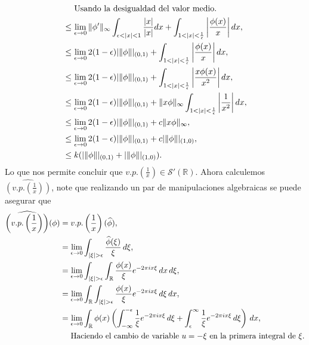 \begin{homeworkProblem}
\begin{solution}
\begin{align*}
      &\phantom{\leq}\hspace{0.2cm}\text{Usando la desigualdad del valor medio.}\\
      &\leq\lim_{\epsilon\rightarrow 0} \|\phi'\|_{\infty}\int_{\epsilon<|x|<1}\frac{|x|}{|x|}dx+\int_{1<|x|<\frac{1}{\epsilon}}\left|\frac{\phi(x)}{x}\right|dx,\\
      &\leq\lim_{\epsilon\rightarrow 0} 2(1-\epsilon)|\|\phi\||_{(0,1)}+\int_{1<|x|<\frac{1}{\epsilon}}\left|\frac{\phi(x)}{x}\right|dx,\\
      &\leq\lim_{\epsilon\rightarrow 0} 2(1-\epsilon)|\|\phi\||_{(0,1)}+\int_{1<|x|<\frac{1}{\epsilon}}\left|\frac{x\phi(x)}{x^2}\right|dx,\\
      &\leq\lim_{\epsilon\rightarrow 0} 2(1-\epsilon)|\|\phi\||_{(0,1)}+\|x\phi\|_{\infty}\int_{1<|x|<\frac{1}{\epsilon}}\left|\frac{1}{x^2}\right|dx,\\
      &\leq \lim_{\epsilon\rightarrow 0}2(1-\epsilon)|\|\phi\||_{(0,1)}+c\|x\phi\|_{\infty},\\
      &\leq \lim_{\epsilon\rightarrow 0}2(1-\epsilon)|\|\phi\||_{(0,1)}+c|\|\phi\||_{(1,0)},\\
      &\leq k(|\|\phi\||_{(0,1)}+|\|\phi\||_{(1,0)}).
    \end{align*}
    Lo que nos permite concluir que $v.p.\left( \frac{1}{x} \right)\in\mathcal{S}'(\mathbb{R})$.
    \newpage
    Ahora calculemos $\hat{\left(v.p.\left( \frac{1}{x} \right)\right)}$, note que realizando un par de manipulaciones algebraicas se puede asegurar que
    \begin{align*}
      \hat{\left( v.p.\left( \frac{1}{x} \right) \right)}(\phi)&=v.p.\left( \frac{1}{x} \right)(\hat{\phi}),\\
      &=\lim_{\epsilon \to 0}\int_{|\xi|>\epsilon}\frac{\hat{\phi}(\xi)}{\xi}\, d\xi,\\
      &=\lim_{\epsilon \to 0}\int_{|\xi|>\epsilon}\int_{\mathbb{R}}\frac{\phi(x)}{\xi}e^{-2\pi ix\xi}\, dx\, d\xi,\\
      &=\lim_{\epsilon \to 0}\int_{\mathbb{R}}\int_{|\xi|>\epsilon}\frac{\phi(x)}{\xi}e^{-2\pi ix\xi}\, d\xi\, dx,\\
      &=\lim_{\epsilon \to 0}\int_{\mathbb{R}}\phi(x)\left(\int_{-\infty}^{-\epsilon}\frac{1}{\xi}e^{-2\pi ix\xi}\, d\xi+\int_{\epsilon}^{\infty}\frac{1}{\xi}e^{-2\pi ix\xi}\, d\xi\right)\, dx,\\
      &\phantom{=}\hspace{0.2cm}\text{Haciendo el cambio de variable $u=-\xi$ en la primera integral de $\xi$.}\\

\end{align*}
\end{solution}
\end{homeworkProblem}
